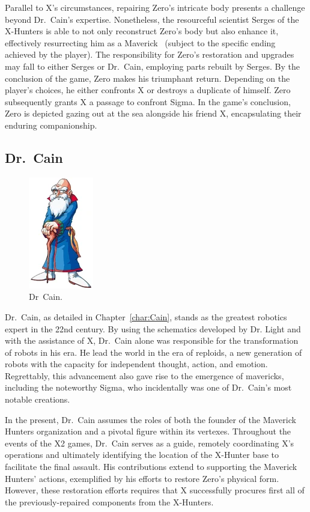 Parallel to X's circumstances, repairing Zero's intricate body presents a challenge beyond Dr.~Cain's expertise. Nonetheless, the resourceful scientist Serges of the X-Hunters is able to not only reconstruct Zero's body but also enhance it, effectively resurrecting him as a Maverick~\cite{wayback:X2_resources} (subject to the specific ending achieved by the player). The responsibility for Zero's restoration and upgrades may fall to either Serges or Dr.~Cain, employing parts rebuilt by Serges. By the conclusion of the game, Zero makes his triumphant return. Depending on the player's choices, he either confronts X or destroys a duplicate of himself. Zero subsequently grants X a passage to confront Sigma. In the game's conclusion, Zero is depicted gazing out at the sea alongside his friend X, encapsulating their enduring companionship.

\subsection{Dr.~Cain}
\begin{figure}[htp]
	\centering
	\includegraphics[height=\portraitsize]{figures/Characters/Char_Cain_X2.png}
	\caption{Dr~Cain.}
\end{figure}
Dr.~Cain, as detailed in Chapter~\ref{char:Cain}, stands as the greatest robotics expert in the 22nd century\cite{Xcoll1:Manual_X2}. By using the schematics developed by Dr. Light and with the assistance of X, Dr.~Cain alone was responsible for the transformation of robots in his era. He lead the world in the era of reploids, a new generation of robots  with the capacity for independent thought, action, and emotion. Regrettably, this advancement also gave rise to the emergence of mavericks, including the noteworthy Sigma, who incidentally was one of Dr.~Cain's most notable creations.

In the present, Dr.~Cain assumes the roles of both the founder of the Maverick Hunters organization and a pivotal figure within its vertexes. Throughout the events of the X2 games, Dr.~Cain serves as a guide, remotely coordinating X's operations and ultimately identifying the location of the X-Hunter base to facilitate the final assault. His contributions extend to supporting the Maverick Hunters' actions, exemplified by his efforts to restore Zero's physical form. However, these restoration efforts requires that X successfully procures  first all of the previously-repaired components from the X-Hunters.

